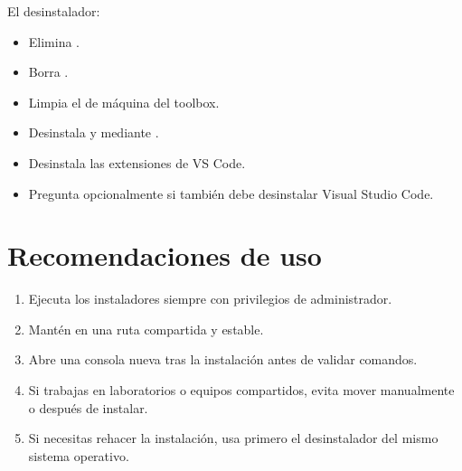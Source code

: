 \documentclass[letterpaper,10pt,english]{sphinxmanual}
\begin{document}
\sphinxAtStartPar
El desinstalador:
\begin{itemize}
\item {} 
\sphinxAtStartPar
Elimina .

\item {} 
\sphinxAtStartPar
Borra .

\item {} 
\sphinxAtStartPar
Limpia el  de máquina del toolbox.

\item {} 
\sphinxAtStartPar
Desinstala  y  mediante .

\item {} 
\sphinxAtStartPar
Desinstala las extensiones de VS Code.

\item {} 
\sphinxAtStartPar
Pregunta opcionalmente si también debe desinstalar Visual Studio Code.

\end{itemize}


\section{Recomendaciones de uso}
\label{\detokenize{vscode:recomendaciones-de-uso}}\begin{enumerate}
%
\item {} 
\sphinxAtStartPar
Ejecuta los instaladores siempre con privilegios de administrador.

\item {} 
\sphinxAtStartPar
Mantén  en una ruta compartida y estable.

\item {} 
\sphinxAtStartPar
Abre una consola nueva tras la instalación antes de validar comandos.

\item {} 
\sphinxAtStartPar
Si trabajas en laboratorios o equipos compartidos, evita mover
manualmente  o  después de instalar.

\item {} 
\sphinxAtStartPar
Si necesitas rehacer la instalación, usa primero el desinstalador del mismo
sistema operativo.

\end{enumerate}
\end{document}
